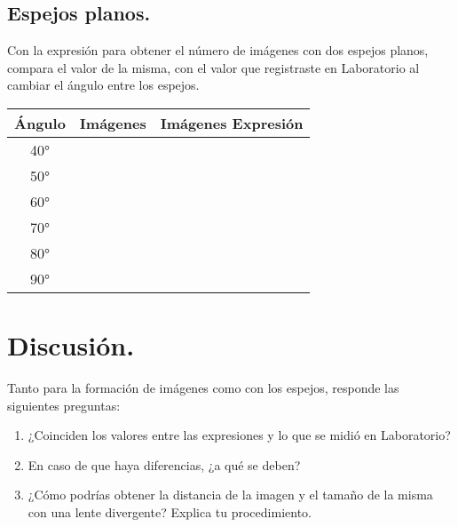 \documentclass[14pt]{extarticle}
\begin{document}
\subsection{Espejos planos.}

Con la expresión para obtener el número de imágenes con dos espejos planos, compara el valor de la misma, con el valor que registraste en Laboratorio al cambiar el ángulo entre los espejos.
\begin{table}[H]
    \centering
    \begin{tabular}{| c | c | c |} \hline
    Ángulo & Imágenes & Imágenes Expresión \\ \hline
    \ang{40} & & \\ \hline
    \ang{50} & & \\ \hline
    \ang{60} & & \\ \hline
    \ang{70} & & \\ \hline
    \ang{80} & & \\ \hline
    \ang{90} & & \\ \hline
    \end{tabular}
\end{table}

\section{Discusión.}

Tanto para la formación de imágenes como con los espejos, responde las siguientes preguntas:
\begin{enumerate}
    \item ¿Coinciden los valores entre las expresiones y lo que se midió en Laboratorio?
    \item En caso de que haya diferencias, ¿a qué se deben?
    \item ¿Cómo podrías obtener la distancia de la imagen y el tamaño de la misma con una lente divergente? Explica tu procedimiento.
\end{enumerate}
\end{document}
